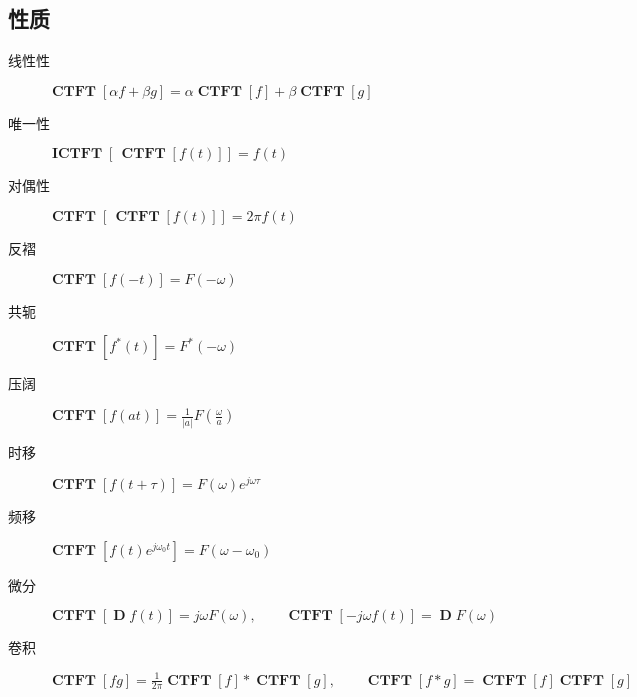 \documentclass{ctexart}
\DeclareMathOperator{\CTFT}{\mathbf{CTFT}}
\DeclareMathOperator{\ICTFT}{\mathbf{ICTFT}}
\DeclareMathOperator{\D}{\mathbf{D}}
\begin{document}
\subsection{性质}
    \begin{description}
        \item[线性性] $\displaystyle \CTFT[\alpha f + \beta g] = \alpha \CTFT[f] + \beta \CTFT[g]$
        \item[唯一性] $\displaystyle \ICTFT[ \, \CTFT[f(t)] ] = f(t)$
        \item[对偶性] $\displaystyle \CTFT [ \, \CTFT[ f(t) ] ] = 2 \pi f(t)$
        \item[反褶] $\displaystyle \CTFT[f(-t)] = F(-\omega)$
        \item[共轭] $\displaystyle \CTFT[f^*(t)] = F^*(-\omega)$
        \item[压阔] $\displaystyle \CTFT[f(at)] = \frac{1}{|a|} F(\frac{\omega}{a})$
        \item[时移] $\displaystyle \CTFT[f(t + \tau)] = F(\omega) e^{j \omega \tau}$
        \item[频移] $\displaystyle \CTFT[f(t) e^{j \omega_0 t}] = F(\omega - \omega_0)$
        \item[微分] $\displaystyle \CTFT[\D f(t)] = j \omega F(\omega),\qquad \CTFT[-j \omega f(t)] = \D F(\omega)$
        \item[卷积] $\displaystyle \CTFT[f g] = \frac{1}{2\pi} \CTFT[f] * \CTFT[g],\qquad \CTFT[f * g] = \CTFT[f] \CTFT[g]$
    \end{description}
\end{document}
